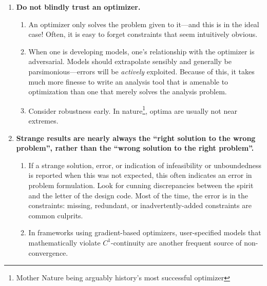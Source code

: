 \begin{enumerate}
\begin{enumerate}
        \item Account for margin separately and explicitly, and usually in key top-level closure loops (weight, drag, power, etc.). Remember that margin is performance beyond the \emph{limit} case, not the \emph{baseline} case\footnote{For example, in aircraft design, thrust margin is the excess beyond what is needed for \emph{climb} (possibly with one engine inoperative), not \emph{cruise}. If performance is ever intended to be used during limit-case operation of the system, this cannot be counted as margin.}. Correction for known unknowns does not count as margin, since margin is for mitigating unknown unknowns.
    \end{enumerate}
    \item \textbf{Do not blindly trust an optimizer.}
    \begin{enumerate}
        \item An optimizer only solves the problem given to it—and this is in the ideal case! Often, it is easy to forget constraints that seem intuitively obvious.
        \item When one is developing models, one's relationship with the optimizer is adversarial. Models should extrapolate sensibly and generally be parsimonious—errors will be \emph{actively} exploited. Because of this, it takes much more finesse to write an analysis tool that is amenable to optimization than one that merely solves the analysis problem.
        \item Consider robustness early. In nature\footnote{Mother Nature being arguably history's most successful optimizer}, optima are usually not near extremes.
    \end{enumerate}
    \item \textbf{Strange results are nearly always the ``right solution to the wrong problem'', rather than the ``wrong solution to the right problem''.}
    \begin{enumerate}
        \item If a strange solution, error, or indication of infeasibility or unboundedness is reported when this was not expected, this often indicates an error in problem formulation. Look for cunning discrepancies between the spirit and the letter of the design code. Most of the time, the error is in the constraints: missing, redundant, or inadvertently-added constraints are common culprits.
        \item In frameworks using gradient-based optimizers, user-specified models that mathematically violate $C^1$-continuity are another frequent source of non-convergence.

\end{enumerate}
\end{enumerate}
